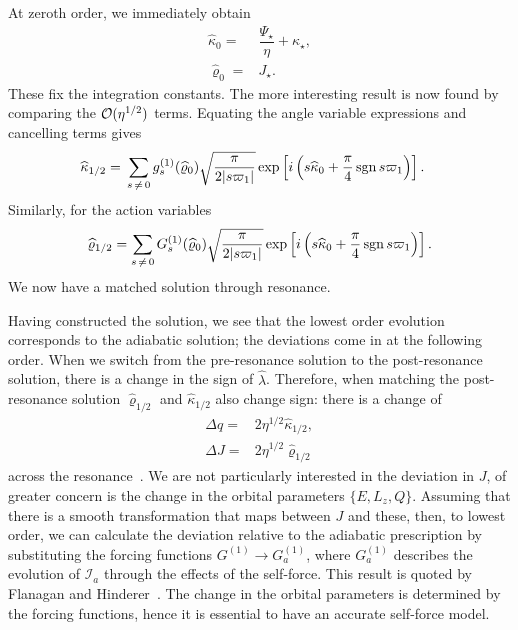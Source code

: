 At zeroth order, we immediately obtain
\begin{align}
\widehat{\kappa}_0 = {} & \dfrac{\Psi_\star}{\eta} + \kappa_\star, \\
\widehat{\varrho}_0 = {} & J_\star.
\end{align}
These fix the integration constants. The more interesting result is now found by comparing the $\mathcal{O}({\eta^{1/2}})$ terms. Equating the angle variable expressions and cancelling terms gives
\begin{align}
\widehat{\kappa}_{1/2} = {} & \sum_{s\,\neq\,0}g_s^{(1)}(\widehat{\varrho}_0)\sqrt{\dfrac{\pi}{2|s\varpi_1|}}\exp\left[i\left(s \widehat{\kappa}_0 + \dfrac{\pi}{4}\operatorname{sgn} s\varpi_1\right)\right].
\end{align}
Similarly, for the action variables
\begin{equation}
\widehat{\varrho}_{1/2} = \sum_{s\,\neq\,0}G_s^{(1)}(\widehat{\varrho}_0)\sqrt{\dfrac{\pi}{2|s\varpi_1|}}\exp\left[i\left(s \widehat{\kappa}_0 + \dfrac{\pi}{4}\operatorname{sgn} s\varpi_1\right)\right].
\label{eq:J-1/2}
\end{equation}
We now have a matched solution through resonance.

Having constructed the solution, we see that the lowest order evolution corresponds to the adiabatic solution; the deviations come in at the following order. When we switch from the pre-resonance solution to the post-resonance solution, there is a change in the sign of $\widehat{\lambda}$. Therefore, when matching the post-resonance solution $\widehat{\varrho}_{1/2}$ and $\widehat{\kappa}_{1/2}$ also change sign: there is a change of
\begin{align}
\Delta q = {} & 2 \eta^{1/2}\widehat{\kappa}_{1/2}, \\
\Delta J = {} & 2 \eta^{1/2}\widehat{\varrho}_{1/2}
\label{eq:jumps}
\end{align}
across the resonance~\cite{Kevorkian1987}. We are not particularly interested in the deviation in $J$, of greater concern is the change in the orbital parameters $\{E,L_z,Q\}$. Assuming that there is a smooth transformation that maps between $J$ and these, then, to lowest order, we can calculate the deviation relative to the adiabatic prescription by substituting the forcing functions $G^{(1)} \rightarrow G_a^{(1)}$, where $G_a^{(1)}$ describes the evolution of $\mathcal{I}_a$ through the effects of the self-force. This result is quoted by Flanagan and Hinderer~\cite{Flanagan2012}. The change in the orbital parameters is determined by the forcing functions, hence it is essential to have an accurate self-force model.

